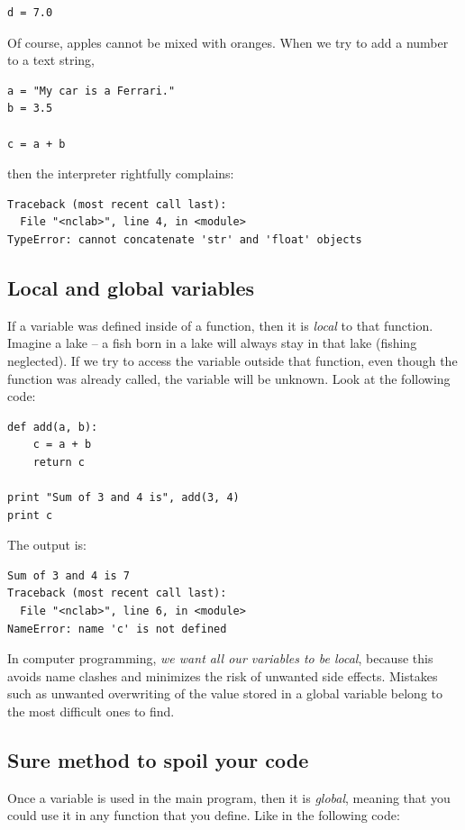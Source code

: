 \begin{verbatim}
d = 7.0
\end{verbatim}
Of course, apples cannot be mixed with oranges. When we try to 
add a number to a text string,

\begin{verbatim}
a = "My car is a Ferrari."
b = 3.5

c = a + b
\end{verbatim}
then the interpreter rightfully complains:

\begin{verbatim}
Traceback (most recent call last):
  File "<nclab>", line 4, in <module>
TypeError: cannot concatenate 'str' and 'float' objects
\end{verbatim}

\subsection{Local and global variables}

If a variable was defined inside of a function, then it is {\em local} to that
function. Imagine a lake -- a fish born in a lake will always 
stay in that lake (fishing neglected). If we try to access 
the variable outside that function, even though the function was 
already called, the variable will be unknown. Look at the following 
code:

\begin{verbatim}
def add(a, b):
    c = a + b
    return c

print "Sum of 3 and 4 is", add(3, 4)
print c
\end{verbatim}
The output is:

\begin{verbatim}
Sum of 3 and 4 is 7
Traceback (most recent call last):
  File "<nclab>", line 6, in <module>
NameError: name 'c' is not defined
\end{verbatim}
In computer programming, {\em we want all our variables to be local}, because 
this avoids name clashes and minimizes the risk of unwanted side effects.
Mistakes such as unwanted overwriting of the value stored in a global variable 
belong to the most difficult ones to find.

\subsection{Sure method to spoil your code}

Once a variable is used in the main program, 
then it is {\em global}, meaning that you could use it in 
any function that you define. Like in the following 
code:

